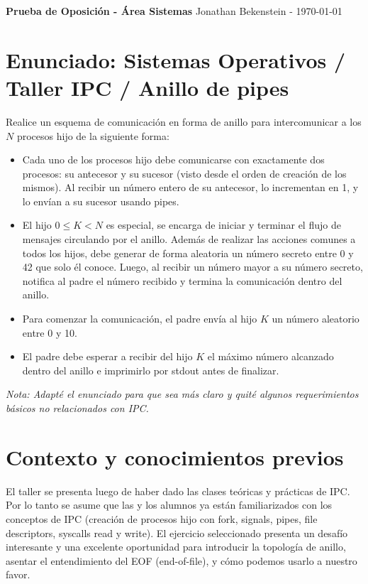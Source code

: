 

\pagesetup{9pt}



\textbf{Prueba de Oposición - Área Sistemas}
\hfill
Jonathan Bekenstein - \today

\section*{Enunciado: Sistemas Operativos / Taller IPC / Anillo de pipes}

Realice un esquema de comunicación en forma de anillo para intercomunicar a los $N$ procesos hijo de la siguiente forma:

\begin{itemize}
    \item Cada uno de los procesos hijo debe comunicarse con exactamente dos procesos: su antecesor y su sucesor (visto desde el orden de creación de los mismos). Al recibir un número entero de su antecesor, lo incrementan en 1, y lo envían a su sucesor usando pipes.
    \item El hijo $0 \leq K < N$ es especial, se encarga de iniciar y terminar el flujo de mensajes circulando por el anillo. Además de realizar las acciones comunes a todos los hijos, debe generar de forma aleatoria un número secreto entre 0 y 42 que solo él conoce. Luego, al recibir un número mayor a su número secreto, notifica al padre el número recibido y termina la comunicación dentro del anillo.
    \item Para comenzar la comunicación, el padre envía al hijo $K$ un número aleatorio entre 0 y 10.
    \item El padre debe esperar a recibir del hijo $K$ el máximo número alcanzado dentro del anillo e imprimirlo por stdout antes de finalizar.
\end{itemize}

\emph{Nota: Adapté el enunciado para que sea más claro y quité algunos requerimientos básicos no relacionados con IPC.}

\section*{Contexto y conocimientos previos}

El taller se presenta luego de haber dado las clases teóricas y prácticas de IPC. Por lo tanto se asume que las y los alumnos ya están familiarizados con los conceptos de IPC (creación de procesos hijo con fork, signals, pipes, file descriptors, syscalls read y write). El ejercicio seleccionado presenta un desafío interesante y una excelente oportunidad para introducir la topología de anillo, asentar el entendimiento del EOF (end-of-file), y cómo podemos usarlo a nuestro favor.

